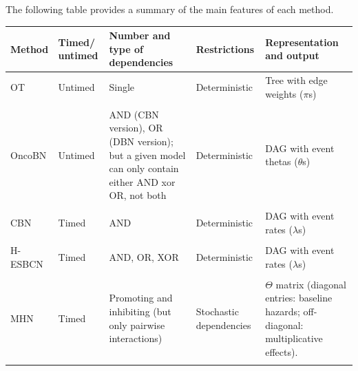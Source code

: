 \documentclass[a4paper,11pt]{article}
\newcommand*{\qrefP}[1]{\hyperref[{#1}]{\textit{``\nameref*{#1}'', section \ref*{#1}}}}
\begin{document}
The following table provides a summary of the main features of each method.\\


\begin{flushleft}
\begin{tabular}{l p{1.5cm} p{4cm} p{2.2cm} p{4cm}}
  \hline
  Method & Timed/
           untimed & Number and type of dependencies & Restrictions & Representation and output\\
  \hline

  OT & Untimed & Single & Deterministic & Tree with edge weights ($\pi$s) \\
  \\
  OncoBN & Untimed & AND (CBN version), OR (DBN version); 
                     but a given model can only contain either
                     AND xor OR, not both & Deterministic & DAG with event thetas ($\theta$s)\\
  \\
  CBN & Timed  & AND & Deterministic & DAG with event rates ($\lambda$s)\\
\\
  H-ESBCN & Timed & AND, OR, XOR & Deterministic & DAG with event rates ($\lambda$s)\\
\\
  MHN & Timed & Promoting and inhibiting (but only pairwise interactions) & Stochastic dependencies & $\Theta$ matrix (diagonal entries: baseline hazards; off-diagonal: multiplicative effects).\\

  \hline\\

  
\end{tabular}
\end{flushleft}







\end{document}
